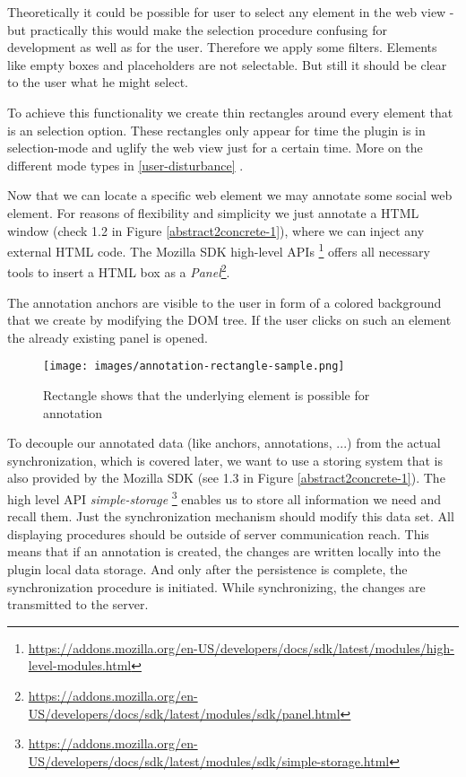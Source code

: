 Theoretically it could be possible for user to select any element in the web view - but practically this would make the selection procedure confusing for development as well as for the user. Therefore we apply some filters. Elements like empty boxes and placeholders are not selectable. 
But still it should be clear to the user what he might select. 

To achieve this functionality we create thin rectangles around every element that is an selection option. These rectangles only appear for time the plugin is in selection-mode and uglify the web view just for a certain time. More on the different mode types in \ref{user-disturbance}  .

Now that we can locate a specific web element we may annotate some social web element. For reasons of flexibility and simplicity we just annotate a HTML window (check 1.2 in Figure \ref{abstract2concrete-1}), where we can inject any external HTML code. The Mozilla SDK high-level APIs \footnote{\url{https://addons.mozilla.org/en-US/developers/docs/sdk/latest/modules/high-level-modules.html}} offers all necessary tools to insert a HTML box as a \emph{Panel}\footnote{\url{https://addons.mozilla.org/en-US/developers/docs/sdk/latest/modules/sdk/panel.html}}.

The annotation anchors are visible to the user in form of a colored background that we create by modifying the DOM tree.
If the user clicks on such an element the already existing panel is opened. 

\begin{figure} \centering
		\texttt{[image: images/annotation-rectangle-sample.png]}
		\caption{Rectangle shows that the underlying element is possible for annotation}
		\label{annotation-rectangle-sample}
\end{figure} 

To decouple our annotated data (like anchors, annotations, ...) from the actual synchronization, which is covered later, we want to use a storing system that is also provided by the Mozilla SDK (see 1.3 in Figure \ref{abstract2concrete-1}). The high level API \emph{simple-storage} \footnote{\url{https://addons.mozilla.org/en-US/developers/docs/sdk/latest/modules/sdk/simple-storage.html}} enables us to store all information we need and recall them. Just the synchronization mechanism should modify this data set. All displaying procedures should be outside of server communication reach. This means that if an annotation is created, the changes are written locally into the plugin local data storage. And only after the persistence is complete, the synchronization procedure is initiated. While synchronizing, the changes are transmitted to the server. 

